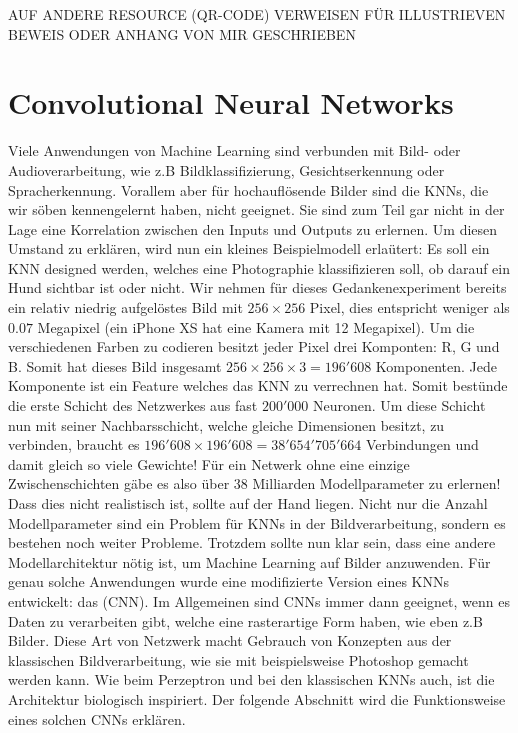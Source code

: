 AUF ANDERE RESOURCE (QR-CODE) VERWEISEN FÜR ILLUSTRIEVEN BEWEIS ODER ANHANG VON
MIR GESCHRIEBEN

\cite{wiki:uat}


\pagebreak
\chapter{Convolutional Neural Networks}\label{sec:CNN}

Viele Anwendungen von Machine Learning sind verbunden mit Bild- oder
Audioverarbeitung, wie z.B Bildklassifizierung, Gesichtserkennung oder
Spracherkennung.
Vorallem aber für hochauflösende Bilder sind die KNNs, die wir söben
kennengelernt haben, nicht geeignet. Sie sind zum Teil gar nicht in der
Lage eine Korrelation zwischen den Inputs und Outputs zu erlernen.
Um diesen Umstand zu erklären, wird nun ein kleines Beispielmodell erlaütert:
\para{}
\label{sec:CNN_parameter_problem}
Es soll ein KNN designed werden, welches eine Photographie klassifizieren
soll, ob darauf ein Hund sichtbar ist oder nicht. Wir nehmen für dieses
Gedankenexperiment bereits ein relativ niedrig aufgelöstes Bild mit $256 \times 256$
Pixel, dies entspricht weniger als $0.07$ Megapixel (ein iPhone XS hat eine Kamera mit
12 Megapixel). Um die verschiedenen Farben zu codieren besitzt jeder Pixel drei Komponten: R, G
und B. Somit hat dieses Bild insgesamt $256 \times 256 \times 3 = 196'608$
Komponenten. Jede Komponente ist ein Feature welches das KNN zu verrechnen hat. Somit bestünde
die erste Schicht des Netzwerkes aus fast $200'000$ Neuronen. Um diese Schicht
nun mit seiner Nachbarsschicht, welche gleiche Dimensionen besitzt, zu verbinden, braucht
es $196'608 \times 196'608 = 38'654'705'664$ Verbindungen und damit gleich so
viele Gewichte! Für ein Netwerk ohne eine einzige Zwischenschichten gäbe es
also über 38 Milliarden Modellparameter zu erlernen! Dass dies nicht realistisch ist,
sollte auf der Hand liegen.
\para{}
Nicht nur die Anzahl Modellparameter sind ein Problem für KNNs in der
Bildverarbeitung, sondern es bestehen noch weiter Probleme.
Trotzdem sollte nun klar sein, dass eine andere Modellarchitektur nötig ist, um Machine
Learning auf Bilder anzuwenden. Für genau solche Anwendungen wurde eine modifizierte
Version eines KNNs entwickelt: das  (CNN).
Im Allgemeinen sind CNNs immer dann geeignet, wenn es Daten zu verarbeiten gibt, welche eine
rasterartige Form haben, wie eben z.B Bilder.
Diese Art von Netzwerk macht Gebrauch von Konzepten aus der klassischen
Bildverarbeitung, wie sie mit beispielsweise Photoshop gemacht werden kann.
Wie beim Perzeptron und bei den klassischen KNNs auch, ist die Architektur
biologisch inspiriert.
Der folgende Abschnitt wird die Funktionsweise eines solchen CNNs erklären.
\para{}
\cite{Goodfellow-et-al-2016}
\cite{deeplearning.ai:cnn}
\cite{wiki:cnn}



